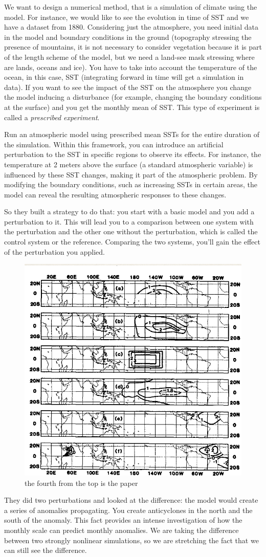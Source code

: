 We want to design a numerical method, that is a  simulation of climate using the model.
For instance, we would like to see the evolution in time of SST and we have a dataset from 1880.
Considering just the atmosphere, you need initial data in the model and boundary conditions in the ground (topography stressing the presence of mountains, it is not necessary to consider vegetation because it is part of the length scheme of the model, but we need a land-see mask stressing where are lands, oceans and ice). You have to take into account the temperature of the ocean, in this case, SST (integrating forward in time will get a simulation in data). If you want to see the impact of the SST on the atmosphere you change the model inducing a disturbance (for example, changing the boundary conditions at the surface) and you get the monthly mean of SST. This type of experiment is called a \textit{prescribed experiment}.


Run an atmospheric model using prescribed mean SSTs for the entire duration of the simulation. Within this framework, you can introduce an artificial perturbation to the SST in specific regions to observe its effects. For instance, the temperature at 2 meters above the surface (a standard atmospheric variable) is influenced by these SST changes, making it part of the atmospheric problem. By modifying the boundary conditions, such as increasing SSTs in certain areas, the model can reveal the resulting atmospheric responses to these changes.



So they built a strategy to do that: you start with a basic model and you add a perturbation to it. This will lead you to a comparison between one system with the perturbation and the other one without the perturbation, which is called the control system or the reference. Comparing the two systems, you'll gain the effect of the perturbation you applied.

\begin{figure}[htpb]
	\centering
	\includegraphics[width=0.35\linewidth]{upload/Screenshot 2024-11-20 212353.png}
	\caption{the fourth from the top is the paper}

\end{figure}
They did two perturbations and looked at the difference: the model would create a series of anomalies propagating. You create anticyclones in the north and the south of the anomaly. This fact provides an intense investigation of how the monthly scale can predict monthly anomalies. We are taking the difference between two strongly nonlinear simulations, so we are stretching the fact that we can still see the difference.

